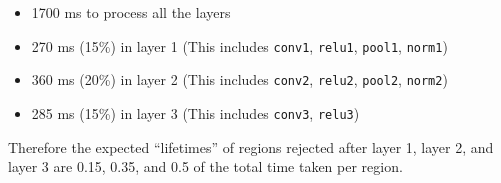 \begin{itemize}
\item 1700 ms to process all the layers
\item 270 ms (15\%) in layer 1 (This includes \texttt{conv1}, \texttt{relu1}, \texttt{pool1}, \texttt{norm1})
\item 360 ms (20\%) in layer 2 (This includes \texttt{conv2}, \texttt{relu2}, \texttt{pool2}, \texttt{norm2})
\item 285 ms (15\%) in layer 3 (This includes \texttt{conv3}, \texttt{relu3})
\end{itemize}

Therefore the expected ``lifetimes'' of regions rejected after layer 1, layer 2, and layer 3 are  0.15, 0.35, and 0.5 of the total time taken per region.


